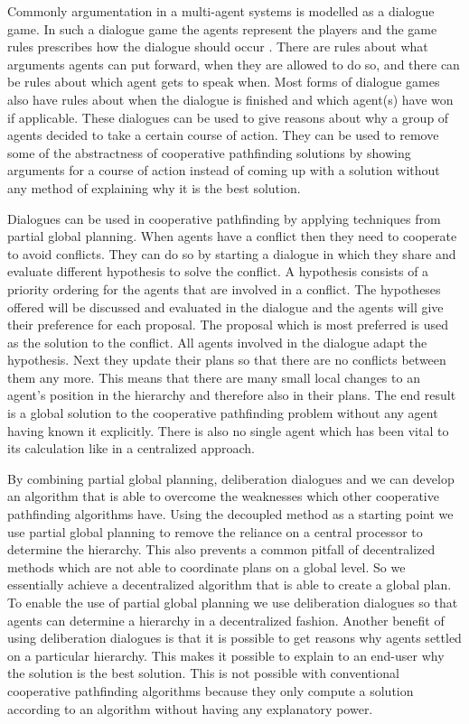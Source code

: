 Commonly argumentation in a multi-agent systems is modelled as a dialogue game.
In such a dialogue game the agents represent the players and the game rules
prescribes how the dialogue should occur \cite{walton1995}. There are rules
about what arguments agents can put forward, when they are allowed to do so,
and there can be rules about which agent gets to speak when. Most forms of
dialogue games also have rules about when the dialogue is finished and which
agent(s) have won if applicable. These dialogues can be used to give reasons
about why a group of agents decided to take a certain course of action. They
can be used to remove some of the abstractness of cooperative pathfinding
solutions by showing arguments for a course of action instead of coming up with
a solution without any method of explaining why it is the best solution.

Dialogues can be used in cooperative pathfinding by applying techniques from
partial global planning. When agents have a conflict then they need to
cooperate to avoid conflicts. They can do so by starting a dialogue in which
they share and evaluate different hypothesis to solve the conflict. A
hypothesis consists of a priority ordering for the agents that are involved in
a conflict. The hypotheses offered will be discussed and evaluated in the
dialogue and the agents will give their preference for each proposal. The
proposal which is most preferred is used as the solution to the conflict. All
agents involved in the dialogue adapt the hypothesis. Next they update their
plans so that there are no conflicts between them any more. This means that
there are many small local changes to an agent's position in the hierarchy and
therefore also in their plans. The end result is a global solution to the
cooperative pathfinding problem without any agent having known it explicitly.
There is also no single agent which has been vital to its calculation like in a
centralized approach.

By combining partial global planning, deliberation dialogues and we can develop
an algorithm that is able to overcome the weaknesses which other cooperative
pathfinding algorithms have. Using the decoupled method as a starting point we
use partial global planning to remove the reliance on a central processor to
determine the hierarchy. This also prevents a common pitfall of decentralized
methods which are not able to coordinate plans on a global level. So we
essentially achieve a decentralized algorithm that is able to create a global
plan. To enable the use of partial global planning we use deliberation
dialogues so that agents can determine a hierarchy in a decentralized fashion.
Another benefit of using deliberation dialogues is that it is possible to get
reasons why agents settled on a particular hierarchy. This makes it possible to
explain to an end-user why the solution is the best solution. This is not
possible with conventional cooperative pathfinding algorithms because they only
compute a solution according to an algorithm without having any explanatory
power.

